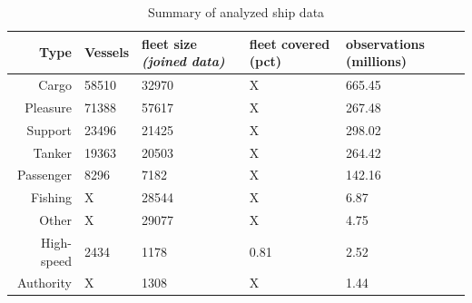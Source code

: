 \begin{table}[htbp]
  \begin{tabular}{rllll} %
    \hline
    Type & Vessels & fleet size \textit{(joined data)} & fleet covered (pct) & observations (millions) \\
    \hline
    Cargo & 58510 & 32970 & X & 665.45 \\
    Pleasure & 71388 & 57617 & X & 267.48 \\
    Support & 23496 & 21425 & X & 298.02 \\
    Tanker & 19363 & 20503 & X & 264.42 \\
    Passenger & 8296 & 7182 & X & 142.16 \\
    Fishing & X & 28544 & X & 6.87 \\
    Other & X & 29077 & X & 4.75 \\
    High-speed & 2434 & 1178 & 0.81 & 2.52 \\
    Authority & X & 1308 & X & 1.44 \\
  \end{tabular}
  \caption{Summary of analyzed ship data}
  \label{table:ships-by-type}
\end{table}







